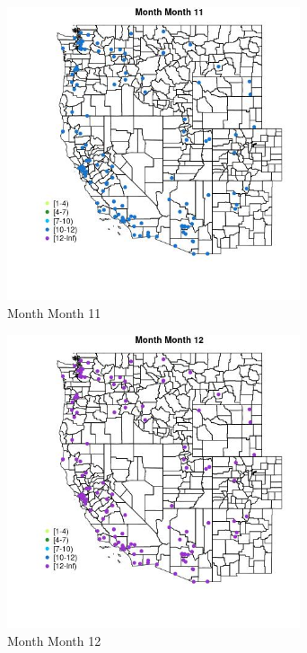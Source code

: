 \begin{figure} 
\centering  
\includegraphics[width=0.77\textwidth]{Code_Outputs/Report_ML_input_PM25_Step4_part_e_de_duplicated_aves_MapObsMo11Month.jpg} 
\caption{\label{fig:Report_ML_input_PM25_Step4_part_e_de_duplicated_avesMapObsMo11Month}Month Month 11} 
\end{figure} 
 

\begin{figure} 
\centering  
\includegraphics[width=0.77\textwidth]{Code_Outputs/Report_ML_input_PM25_Step4_part_e_de_duplicated_aves_MapObsMo12Month.jpg} 
\caption{\label{fig:Report_ML_input_PM25_Step4_part_e_de_duplicated_avesMapObsMo12Month}Month Month 12} 
\end{figure} 
 

